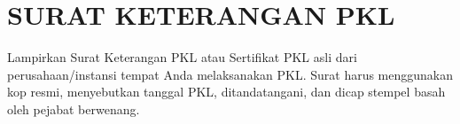 \clearpage
\chapter*{SURAT KETERANGAN PKL}
\label{lamp:keterangan-riset}

Lampirkan Surat Keterangan PKL atau Sertifikat PKL asli dari perusahaan/instansi tempat Anda melaksanakan PKL. Surat harus menggunakan kop resmi, menyebutkan tanggal PKL, ditandatangani, dan dicap stempel basah oleh pejabat berwenang.

\begin{center}
\end{center}
